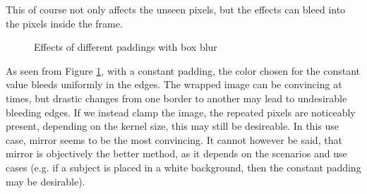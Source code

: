 \documentclass[twoside,a4paper,article]{combine}
\begin{document}
This of course not only affects the unseen pixels, but the effects can bleed into the pixels inside the frame.
\begin{minipage}{\textwidth}\begin{figure}[H]
    \captionsetup{justification=centering}
    \centering
    \caption{Effects of different paddings with box blur}
    \label{fig:boxBlur_borders}
\end{figure}\end{minipage}

As seen from Figure \ref{fig:boxBlur_borders}, with a constant padding, the color chosen for the constant value bleeds uniformly in the edges. The wrapped image
can be convincing at times, but drastic changes from one border to another may lead to undesirable bleeding edges. If we instead clamp the image, the repeated pixels are noticeably
present, depending on the kernel size, this may still be desireable. In this use case, mirror seems to be the most convincing. It cannot however be said, that mirror is objectively the better
method, as it depends on the scenarios and use cases (e.g. if a subject is placed in a white background, then the constant padding may be desirable).
\end{document}
